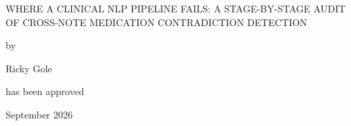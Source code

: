 \begin{frontmatterpage}
  \centering
  \singlespacing
  
  {\normalsize\selectfont\MakeUppercase{Where a Clinical NLP Pipeline Fails: A Stage-by-Stage Audit of Cross-Note Medication Contradiction Detection}\par}

  \vspace{0.25in}
  by\par
  \vspace{0.2in}
  Ricky Gole\par

  \vspace{0.5in}
  has been approved\par
  \vspace{0.2in}
  September 2026\par


\end{frontmatterpage}
